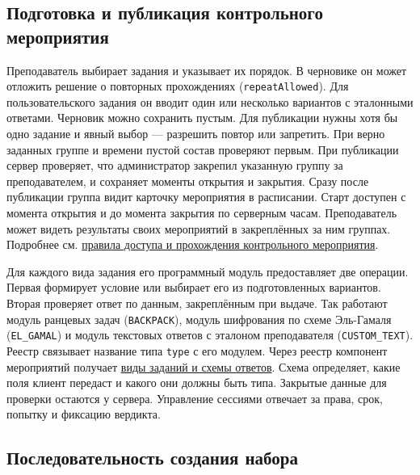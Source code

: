 \documentclass[12pt,a4paper]{article}
\begin{document}
\subsection{Подготовка и публикация контрольного мероприятия}\label{ux43fux43eux434ux433ux43eux442ux43eux432ux43aux430-ux438-ux43fux443ux431ux43bux438ux43aux430ux446ux438ux44f-ux43aux43eux43dux442ux440ux43eux43bux44cux43dux43eux433ux43e-ux43cux435ux440ux43eux43fux440ux438ux44fux442ux438ux44f}

\hypertarget{подготовка-и-публикация-контрольного-мероприятия}{}

Преподаватель выбирает задания и указывает их порядок. В черновике он может отложить решение о повторных прохождениях (\texttt{repeat\allowbreak{}Allowed}). Для пользовательского задания он вводит один или несколько вариантов с эталонными ответами. Черновик можно сохранить пустым. Для публикации нужны хотя бы одно задание и явный выбор --- разрешить повтор или запретить. При верно заданных группе и времени пустой состав проверяют первым. При публикации сервер проверяет, что администратор закрепил указанную группу за преподавателем, и сохраняет моменты открытия и закрытия. Сразу после публикации группа видит карточку мероприятия в расписании. Старт доступен с момента открытия и до момента закрытия по серверным часам. Преподаватель может видеть результаты своих мероприятий в закреплённых за ним группах. Подробнее см. {\href{../02\_Техническое\_задание/DOC-02\_Техническое\_задание.pdf\#правила-доступа-и-прохождения-контрольного-мероприятия}{правила доступа и прохождения контрольного мероприятия}}.

Для каждого вида задания его программный модуль предоставляет две операции. Первая формирует условие или выбирает его из подготовленных вариантов. Вторая проверяет ответ по данным, закреплённым при выдаче. Так работают модуль ранцевых задач (\texttt{BACKPACK}), модуль шифрования по схеме Эль-Гамаля (\texttt{EL\_GAMAL}) и модуль текстовых ответов с эталоном преподавателя (\texttt{CUSTOM\_\allowbreak{}TEXT}). Реестр связывает название типа \texttt{type} с его модулем. Через реестр компонент мероприятий получает {\hyperlink{swr-sys-015-единый-интерфейс-вида-задания}{виды заданий и схемы ответов}}. Схема определяет, какие поля клиент передаст и какого они должны быть типа. Закрытые данные для проверки остаются у сервера. Управление сессиями отвечает за права, срок, попытку и фиксацию вердикта.

\subsection{Последовательность создания набора}\label{ux43fux43eux441ux43bux435ux434ux43eux432ux430ux442ux435ux43bux44cux43dux43eux441ux442ux44c-ux441ux43eux437ux434ux430ux43dux438ux44f-ux43dux430ux431ux43eux440ux430}
\end{document}
